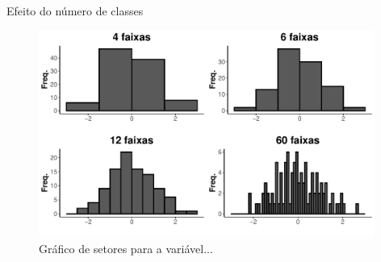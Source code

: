 \documentclass[
  ignorenonframetext,
  serif,
  professionalfont,
  usenames,
  dvipsnames,
  aspectratio = 169]{beamer}
\begin{document}
\begin{frame}{Efeito do número de classes}
\protect\hypertarget{efeito-do-nuxfamero-de-classes-1}{}
\begin{figure}

{\centering \includegraphics[width=11cm]{200-exploratoria-uni-tabelas-graficos_files/figure-beamer/unnamed-chunk-22-1} 

}

\caption{Gráfico de setores para a variável...}\label{fig:unnamed-chunk-22}
\end{figure}
\end{frame}
\end{document}
